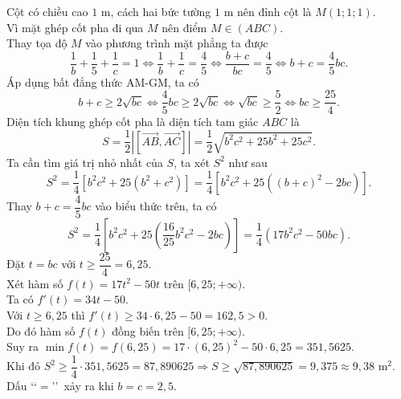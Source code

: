 \begin{ex}
{{
		}
		\noindent Cột có chiều cao $1$ m, cách hai bức tường $1$ m nên đỉnh cột là $M(1;1;1)$.\\
		Vì mặt ghép cốt pha đi qua $M$ nên điểm $M \in (ABC)$.\\
		Thay tọa độ $M$ vào phương trình mặt phẳng ta được
		\[\dfrac{1}{b} + \dfrac{1}{5} + \dfrac{1}{c} = 1 \Leftrightarrow \dfrac{1}{b} + \dfrac{1}{c} = \dfrac{4}{5} \Leftrightarrow \dfrac{b+c}{bc} = \dfrac{4}{5} \Leftrightarrow b+c = \dfrac{4}{5}bc.\]
		Áp dụng bất đẳng thức AM-GM, ta có
		\[b+c \ge 2\sqrt{bc} \Leftrightarrow \dfrac{4}{5}bc \ge 2\sqrt{bc} \Leftrightarrow \sqrt{bc} \ge \dfrac{5}{2} \Leftrightarrow bc \ge \dfrac{25}{4}.\]
		Diện tích khung ghép cốt pha là diện tích tam giác $ABC$ là
		\[S = \dfrac{1}{2} \left| \left[ \overrightarrow{AB}, \overrightarrow{AC} \right] \right| = \dfrac{1}{2} \sqrt{b^2c^2 + 25b^2 + 25c^2}.\]
		Ta cần tìm giá trị nhỏ nhất của $S$, ta xét $S^2$ như sau
		\[S^2 = \dfrac{1}{4} \left[ b^2c^2 + 25(b^2+c^2) \right] = \dfrac{1}{4} \left[ b^2c^2 + 25 \left( (b+c)^2 - 2bc \right) \right].\]
		Thay $b+c = \dfrac{4}{5}bc$ vào biểu thức trên, ta có
		\[S^2 = \dfrac{1}{4} \left[ b^2c^2 + 25 \left( \dfrac{16}{25}b^2c^2 - 2bc \right) \right] = \dfrac{1}{4} \left( 17b^2c^2 - 50bc \right).\]
		Đặt $t = bc$ với $t \ge \dfrac{25}{4} = 6{,}25$.\\
		Xét hàm số $f(t) = 17t^2 - 50t$ trên $[6{,}25; +\infty)$.\\
		Ta có $f'(t) = 34t - 50$.\\
		Với $t \ge 6{,}25$ thì $f'(t) \ge 34\cdot 6{,}25 - 50 = 162{,}5 > 0$.\\
		Do đó hàm số $f(t)$ đồng biến trên $[6{,}25; +\infty)$.\\
		Suy ra $\min f(t) = f(6{,}25) = 17\cdot (6{,}25)^2 - 50\cdot 6{,}25 = 351{,}5625$.\\
		Khi đó $S^2 \ge \dfrac{1}{4} \cdot 351{,}5625 = 87{,}890625 \Rightarrow S \ge \sqrt{87{,}890625} = 9{,}375 \approx 9{,}38 \text{ m}^2$.\\
		Dấu \lq\lq $=$\rq\rq\ xảy ra khi $b=c=2{,}5$.
	}
\end{ex}

